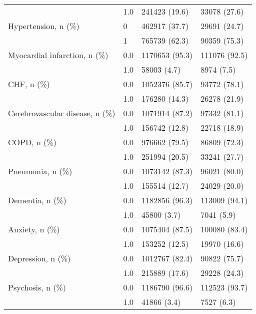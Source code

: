 \begin{tabular}{llll}
                                       & 1.0 &           241423 (19.6) &      33078 (27.6) \\
Hypertension, n (\%) & 0 &           462917 (37.7) &      29691 (24.7) \\
                                       & 1 &           765739 (62.3) &      90359 (75.3) \\
Myocardial infarction, n (\%) & 0.0 &          1170653 (95.3) &     111076 (92.5) \\
                                       & 1.0 &             58003 (4.7) &        8974 (7.5) \\
CHF, n (\%) & 0.0 &          1052376 (85.7) &      93772 (78.1) \\
                                       & 1.0 &           176280 (14.3) &      26278 (21.9) \\
Cerebrovascular disease, n (\%) & 0.0 &          1071914 (87.2) &      97332 (81.1) \\
                                       & 1.0 &           156742 (12.8) &      22718 (18.9) \\
COPD, n (\%) & 0.0 &           976662 (79.5) &      86809 (72.3) \\
                                       & 1.0 &           251994 (20.5) &      33241 (27.7) \\
Pneumonia, n (\%) & 0.0 &          1073142 (87.3) &      96021 (80.0) \\
                                       & 1.0 &           155514 (12.7) &      24029 (20.0) \\
Dementia, n (\%) & 0.0 &          1182856 (96.3) &     113009 (94.1) \\
                                       & 1.0 &             45800 (3.7) &        7041 (5.9) \\
Anxiety, n (\%) & 0.0 &          1075404 (87.5) &     100080 (83.4) \\
                                       & 1.0 &           153252 (12.5) &      19970 (16.6) \\
Depression, n (\%) & 0.0 &          1012767 (82.4) &      90822 (75.7) \\
                                       & 1.0 &           215889 (17.6) &      29228 (24.3) \\
Psychosis, n (\%) & 0.0 &          1186790 (96.6) &     112523 (93.7) \\
                                       & 1.0 &             41866 (3.4) &        7527 (6.3) \\

\end{tabular}

